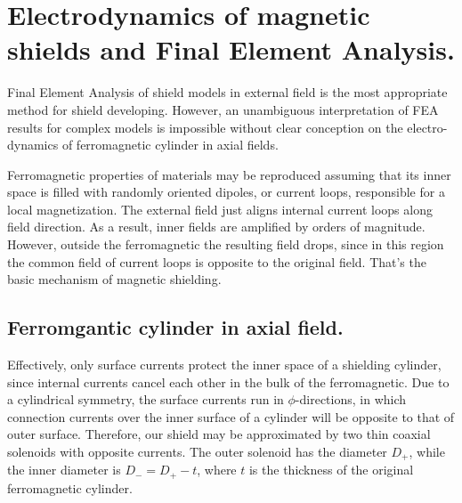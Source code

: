 \documentclass[12pt]{article}
\begin{document}
\pagebreak
\newpage
\section{Electrodynamics of   magnetic shields  and Final Element Analysis.}
\label{ednmics}
Final Element Analysis   of  shield models   in external field  is the most appropriate method for shield developing.
However, an unambiguous interpretation of  FEA results for complex  models  is impossible without clear  conception on  the     
electro-dynamics of ferromagnetic  cylinder in axial fields.

Ferromagnetic properties of materials may be reproduced assuming that  its  
inner space is filled with  randomly oriented  dipoles, or current loops, responsible for 
a local  magnetization. The external  field  just aligns internal  current loops along 
field  direction. As a result, inner   fields  are amplified  by  
orders of magnitude. However,  outside the ferromagnetic the resulting field  
drops, since   in this region the  common  field of  current loops  
is opposite to the original  field. 
That's the basic mechanism of magnetic shielding.


\subsection{Ferromgantic cylinder in axial field.}
Effectively, only surface currents protect the inner space of a shielding cylinder, since 
internal  currents cancel each other in the bulk of the ferromagnetic.
Due to a cylindrical symmetry, the surface  currents  run in $\phi$-directions,
in which connection  currents over the inner surface of a cylinder
will be opposite to that of  outer surface. Therefore, our shield  
may be approximated by two  thin coaxial solenoids with opposite currents.
The outer solenoid has the diameter $D_+$, while the inner diameter is
$D_-=D_+-t$, where $t$ is the thickness of the original ferromagnetic cylinder.
\end{document}

